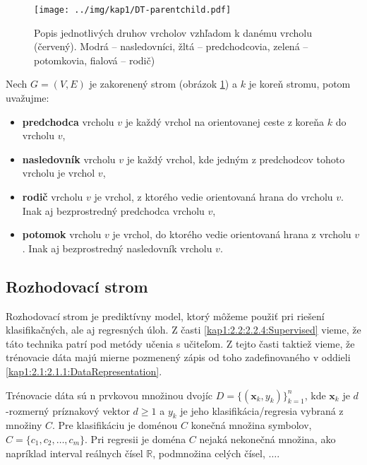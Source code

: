 \begin{figure}[h]
\centering
\centerline{\mbox{\texttt{[image: ../img/kap1/DT-parentchild.pdf]}}}
\caption{Popis jednotlivých druhov vrcholov vzhľadom k danému vrcholu (červený). Modrá -- nasledovníci, žltá -- predchodcovia, zelená -- potomkovia, fialová -- rodič)}\label{fig:decisionTreeParentChild}
\end{figure}

\begin{def-sk}\label{kap1:2.3:2.3.1:naslednik}
Nech $G = (V,E)$ je zakorenený strom (obrázok \ref{fig:decisionTreeParentChild}) a $k$ je koreň stromu, potom uvažujme:
\begin{itemize}
\item \textbf{predchodca} vrcholu $v$ je každý vrchol na orientovanej ceste z koreňa $k$ do vrcholu $v$,
\item \textbf{nasledovník} vrcholu $v$ je každý vrchol, kde jedným z predchodcov tohoto vrcholu je vrchol $v$,
\item \textbf{rodič} vrcholu $v$ je vrchol, z ktorého vedie orientovaná hrana do vrcholu $v$. Inak aj bezprostredný predchodca vrcholu $v$,
\item \textbf{potomok} vrcholu $v$ je vrchol, do ktorého vedie orientovaná hrana z vrcholu $v$. Inak aj bezprostredný nasledovník vrcholu $v$.
\end{itemize} 
\end{def-sk}

\subsection{Rozhodovací strom}\label{kap1:2.3:2.3.2}
Rozhodovací strom je prediktívny model, ktorý môžeme použiť pri riešení klasifikačných, ale aj regresných úloh. Z časti \ref{kap1:2.2:2.2.4:Supervised} vieme, že táto technika patrí pod metódy učenia s učiteľom. Z tejto časti taktiež vieme, že trénovacie dáta majú mierne pozmenený zápis od toho zadefinovaného v oddieli \ref{kap1:2.1:2.1.1:DataRepresentation}.

\begin{def-sk}\label{kap1:2.3:2.3.2:traindata}
Trénovacie dáta sú n prvkovou množinou dvojíc $D = \{(\mathbf{x}_{k},y_{k})\}_{k=1}^{n}$, kde $\mathbf{x}_{k}$ je $d$-rozmerný príznakový vektor $d \geq 1$ a $y_{k}$ je jeho klasifikácia/regresia vybraná z množiny $C$. Pre klasifikáciu je doménou $C$ konečná množina symbolov, $C = \{c_{1},c_{2},\ldots,c_{m}\}$. Pri regresii je doména $C$ nejaká nekonečná množina, ako napríklad interval reálnych čísel $\mathbb{R}$, podmnožina celých čísel, $\ldots$.
\end{def-sk}

